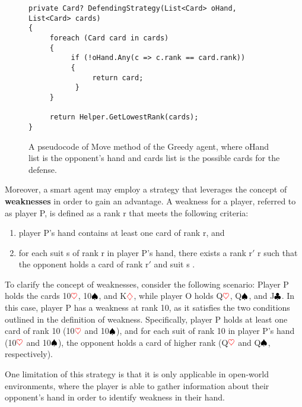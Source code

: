 \begin{figure}[h]
\captionsetup{justification=centering}
\begin{lstlisting}[frame=single]
private Card? DefendingStrategy(List<Card> oHand, List<Card> cards)
{
     foreach (Card card in cards)
     {
          if (!oHand.Any(c => c.rank == card.rank))
          {
               return card;
           }
     }

     return Helper.GetLowestRank(cards);
}
\end{lstlisting}
\caption{A pseudocode of Move method of the Greedy agent, where oHand list is the opponent's hand and cards list is the possible cards for the defense.}
\label{fig:defStratSmart}
\end{figure}

Moreover, a smart agent may employ a strategy that leverages the concept of \textbf{weaknesses} in order to gain an advantage. A weakness for a player, referred to as player P, is defined as a rank r that meets the following criteria: 
\begin{enumerate}
	\item player P's hand contains at least one card of rank r, and
	\item for each suit s of rank r in player P's hand, there exists a rank r$'$ \> r such that the opponent holds a card of rank r$'$ and suit s \citep{Bonnet2016TheCO}.
\end{enumerate}

To clarify the concept of weaknesses, consider the following scenario: Player P holds the cards 10$\textcolor{red}{\heartsuit}$, 10$\textcolor{black}{\spadesuit}$, and K$\textcolor{red}{\diamondsuit}$, while player O holds Q$\textcolor{red}{\heartsuit}$, Q$\textcolor{black}{\spadesuit}$, and J$\textcolor{black}{\clubsuit}$. In this case, player P has a weakness at rank 10, as it satisfies the two conditions outlined in the definition of weakness. Specifically, player P holds at least one card of rank 10 (10$\textcolor{red}{\heartsuit}$ and 10$\textcolor{black}{\spadesuit}$), and for each suit of rank 10 in player P's hand (10$\textcolor{red}{\heartsuit}$ and 10$\textcolor{black}{\spadesuit}$), the opponent holds a card of higher rank (Q$\textcolor{red}{\heartsuit}$ and Q$\textcolor{black}{\spadesuit}$, respectively).

One limitation of this strategy is that it is only applicable in open-world environments, where the player is able to gather information about their opponent's hand in order to identify weakness in their hand. 

